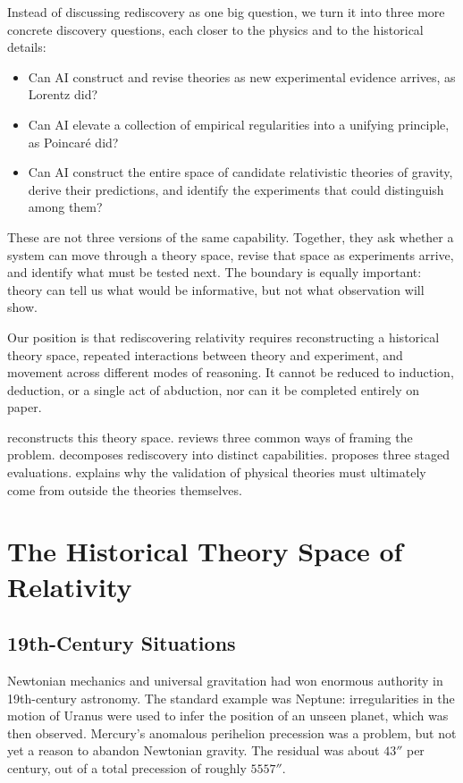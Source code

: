 \documentclass{article}
\begin{document}
Instead of discussing rediscovery as one big question, we turn it into three more concrete discovery questions, each closer to the physics and to the historical details:
\begin{itemize}
  \setlength{\itemsep}{0.15em}
  \setlength{\parsep}{0pt}
  \setlength{\topsep}{0.2em}
  \item Can AI construct and revise theories as new experimental evidence arrives, as Lorentz did?
  \item Can AI elevate a collection of empirical regularities into a unifying principle, as Poincaré did?
  \item Can AI construct the entire space of candidate relativistic theories of gravity, derive their predictions, and identify the experiments that could distinguish among them?
\end{itemize}
\vspace{-0.45em}

These are not three versions of the same capability. Together, they ask whether a system can move through a theory space, revise that space as experiments arrive, and identify what must be tested next. The boundary is equally important: theory can tell us what would be informative, but not what observation will show.

Our position is that rediscovering relativity requires reconstructing a historical theory space, repeated interactions between theory and experiment, and movement across different modes of reasoning. It cannot be reduced to induction, deduction, or a single act of abduction, nor can it be completed entirely on paper.

 reconstructs this theory space.  reviews three common ways of framing the problem.  decomposes rediscovery into distinct capabilities.  proposes three staged evaluations.  explains why the validation of physical theories must ultimately come from outside the theories themselves.

\section{The Historical Theory Space of Relativity}
\label{sec:historical-theory-space}

\subsection{19th-Century Situations}
Newtonian mechanics and universal gravitation had won enormous authority in 19th-century astronomy. The standard example was Neptune: irregularities in the motion of Uranus were used to infer the position of an unseen planet, which was then observed. Mercury's anomalous perihelion precession was a problem, but not yet a reason to abandon Newtonian gravity. The residual was about $43''$ per century, out of a total precession of roughly $5557''$.
\end{document}
